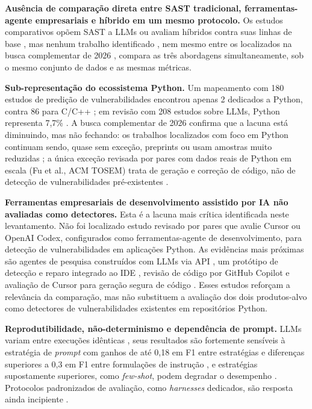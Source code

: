 \textbf{Ausência de comparação direta entre SAST tradicional, ferramentas-agente empresariais e híbrido em um mesmo protocolo.} Os estudos comparativos opõem SAST a LLMs \cite{Ozturk2023AIvsSAST, Tamberg2025LLMHarness, Gnieciak2025LLMvsSAST, Zhou2024SASTLLMRepo} ou avaliam híbridos contra suas linhas de base \cite{Ciavatta2026LLMSAST, Ameen2026QASecClaw}, mas nenhum trabalho identificado , nem mesmo entre os localizados na busca complementar de 2026 , compara as três abordagens simultaneamente, sob o mesmo conjunto de dados e as mesmas métricas.

\textbf{Sub-representação do ecossistema Python.} Um mapeamento com 180 estudos de predição de vulnerabilidades encontrou apenas 2 dedicados a Python, contra 86 para C/C++ \cite{Kalouptsoglou2023VulnPrediction}; em revisão com 208 estudos sobre LLMs, Python representa 7,7\% \cite{Germano2025LLMSLR}. A busca complementar de 2026 confirma que a lacuna está diminuindo, mas não fechando: os trabalhos localizados com foco em Python continuam sendo, quase sem exceção, preprints \cite{Pellew2026RealVuln, Marquer2026SAGA, Tsigkourakos2026QRS, Zhou2024SASTLLMRepo, Adnan2026ALPHA} ou usam amostras muito reduzidas \cite{Farasat2025PythonSecurity}; a única exceção revisada por pares com dados reais de Python em escala (Fu et al., ACM TOSEM) trata de geração e correção de código, não de detecção de vulnerabilidades pré-existentes \cite{Fu2025CopilotSecurity}.

\textbf{Ferramentas empresariais de desenvolvimento assistido por IA não avaliadas como detectores.} Esta é a lacuna mais crítica identificada neste levantamento. Não foi localizado estudo revisado por pares que avalie Cursor ou OpenAI Codex, configurados como ferramentas-agente de desenvolvimento, para detecção de vulnerabilidades em aplicações Python. As evidências mais próximas são agentes de pesquisa construídos com LLMs via API \cite{Yildiz2025LLMAgents, Widyasari2026VulTrial}, um protótipo de detecção e reparo integrado ao IDE \cite{Steenhoek2025IDEUserStudy}, revisão de código por GitHub Copilot \cite{Amro2025CopilotReview} e avaliação de Cursor para geração segura de código \cite{Nie2025SecCodePLT}. Esses estudos reforçam a relevância da comparação, mas não substituem a avaliação dos dois produtos-alvo como detectores de vulnerabilidades existentes em repositórios Python.

\textbf{Reprodutibilidade, não-determinismo e dependência de prompt.} LLMs variam entre execuções idênticas \cite{Ozturk2023AIvsSAST}, seus resultados são fortemente sensíveis à estratégia de \textit{prompt} com ganhos de até 0,18 em F1 entre estratégias \cite{Khare2025LLMEffectiveness} e diferenças superiores a 0,3 em F1 entre formulações de instrução \cite{Iranmanesh2025ZeroFalse} , e estratégias supostamente superiores, como \textit{few-shot}, podem degradar o desempenho \cite{Lin2025LLMCompare}. Protocolos padronizados de avaliação, como \textit{harnesses} dedicados, são resposta ainda incipiente \cite{Tamberg2025LLMHarness}.

